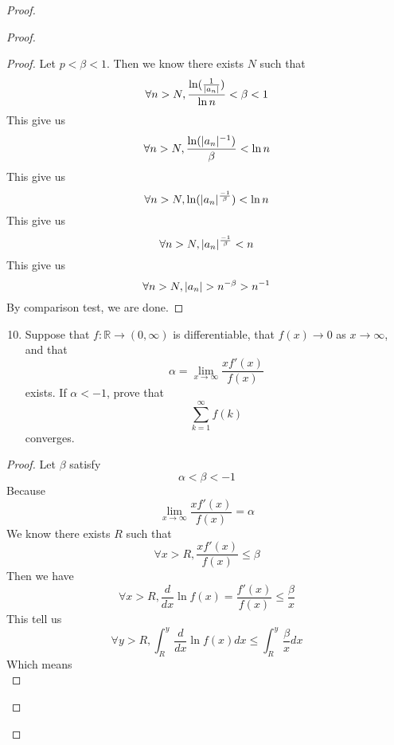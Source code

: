 \documentclass{report}
\begin{document}
\begin{proof}
\begin{proof}
\begin{proof}
Let $p<\beta <1$. Then we know there exists $N$ such that
\begin{equation}
\forall n>N, \frac{\ln (\frac{1}{|a_n|})}{\ln n}<\beta <1
\end{equation}
This give us
\begin{equation}
  \forall n>N, \frac{\ln(|a_n|^{-1})}{\beta }<\ln n
\end{equation}
This give us
\begin{equation}
\forall n>N, \ln(|a_n|^{\frac{-1}{\beta }})<\ln n 
\end{equation}
This give us
\begin{equation}
\forall n>N, |a_n|^{\frac{-1}{\beta }}<n
\end{equation}
This give us
\begin{equation}
\forall n>N, \abso{a_n}>n^{-\beta }>n^{-1}
\end{equation}
By comparison test, we are done.
\end{proof}
\begin{question}{}{}
\begin{enumerate}
    \setcounter{enumi}{9}
    \item Suppose that \( f : \mathbb{R} \to (0,\infty) \) is differentiable, that \( f(x) \to 0 \) as \( x \to \infty \), and that
    \[
    \alpha = \lim_{{x \to \infty}} \frac{xf'(x)}{f(x)}
    \]
    exists. If \( \alpha < -1 \), prove that
    \[
    \sum_{k=1}^{\infty} f(k)
    \]
    converges.
\end{enumerate}
\end{question}
\begin{proof}
Let $\beta $ satisfy
\begin{equation}
\alpha<\beta <-1 
\end{equation}
Because
\begin{equation}
\lim_{x\to\infty}\frac{xf'(x)}{f(x)}=\alpha 
\end{equation}
We know there exists $R$ such that
\begin{equation}
\forall x>R, \frac{xf'(x)}{f(x)}\leq \beta 
\end{equation}
Then we have
\begin{equation}
\forall x>R, \frac{d}{dx}\ln f(x)=\frac{f'(x)}{f(x)}\leq \frac{\beta }{x}
\end{equation}
This tell us 
\begin{equation}
  \forall y>R, \int^y_R \frac{d}{dx}\ln f(x)dx\leq \int^y_R \frac{\beta}{x}dx
\end{equation}
Which means
\begin{equation}

\end{equation}
\end{proof}
\end{proof}
\end{proof}
\end{document}
